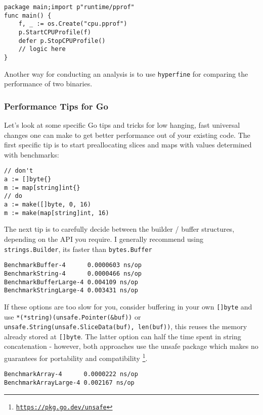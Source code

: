     \begin{verbatim}
package main;import p"runtime/pprof"
func main() {
    f, _ := os.Create("cpu.pprof")
    p.StartCPUProfile(f)
    defer p.StopCPUProfile()
    // logic here
}
    \end{verbatim}

    Another way for conducting an analysis is to use \texttt{hyperfine} for
    comparing the performance of two binaries.

    \subsubsection*{Performance Tips for Go}

    Let's look at some specific Go tips and tricks for low hanging, fast
    universal changes one can make to get better performance out of your
    existing code. The first specific tip is to start preallocating slices and
    maps with values determined with benchmarks:

    \begin{verbatim}
// don't
a := []byte{}
m := map[string]int{}
// do
a := make([]byte, 0, 16)
m := make(map[string]int, 16)
    \end{verbatim}

    The next tip is to carefully decide between the builder / buffer
    structures, depending on the API you require. I generally recommend using
    \texttt{strings.Builder}, its faster than
    \texttt{bytes.Buffer} 

    \begin{verbatim}
BenchmarkBuffer-4      0.0000603 ns/op
BenchmarkString-4      0.0000466 ns/op
BenchmarkBufferLarge-4 0.004109 ns/op
BenchmarkStringLarge-4 0.003431 ns/op
    \end{verbatim}

    If these options are too slow for you, consider buffering in your own
    \texttt{[]byte} and use
    \texttt{*(*string)(unsafe.Pointer(&buf))} or
    \texttt{unsafe.String(unsafe.SliceData(buf), len(buf))}, this reuses
    the memory already stored at \texttt{[]byte}. The latter option can
    half the time spent in string concatenation - however, both approaches use
    the unsafe package which makes no guarantees for portability and
    compatibility
    \footnote{\href{https://pkg.go.dev/unsafe}{\texttt{https://pkg.go.dev/unsafe}}}.

    \begin{verbatim}
BenchmarkArray-4      0.0000222 ns/op
BenchmarkArrayLarge-4 0.002167 ns/op
    \end{verbatim}

